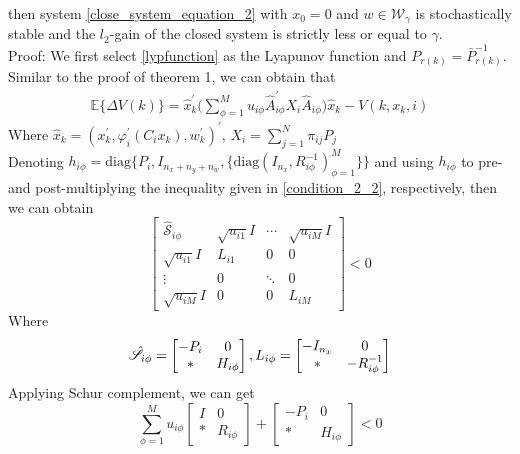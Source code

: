 \documentclass[conference]{IEEEtran}
\begin{document}
then system \eqref{close_system_equation_2}  with $x_0=0$ and $w\in\mathcal{W}_{\gamma}$ is stochastically stable and the $l_2$-gain of the closed system is strictly less or equal to $\gamma$.
\\
Proof: We first select \eqref{lypfunction} as the Lyapunov function and $P_{r(k)}=\bar{P}^{-1}_{r(k)}$. Similar to the proof of theorem 1, we can obtain that
\begin{equation}
	\begin{split}
		\mathbb{E}\{\varDelta V(k)\}=\hat{x}^{'}_{k} \Big( \sum_{\phi=1}^{M}u_{i\phi}\hat{A}^{'}_{i\phi}X_{i}\hat{A}_{i\phi}\Big) \hat{x}_{k} -V(k,x_k,i)
	\end{split}
\end{equation}
Where $\hat{x}_{k}=(x^{'}_{k},\varphi^{'}_{i}(C_{i}x_{k}),w^{'}_{k})^{'}$, $ X_{i}=\sum_{j=1}^{N}\pi_{ij}P_{j}$ \\
Denoting $h_{i\phi} = \mathrm{diag}\{P_{i}, I_{n_x+n_y+n_w},\{\mathrm{diag}(I_{n_x},R^{-1}_{i\phi})^{M}_{\phi=1} \} \}$ and using $h_{i\phi}$ to pre- and post-multiplying the inequality given in \eqref{condition_2_2}, respectively, then we can obtain \\
\begin{equation}\nonumber
\begin{bmatrix} 
\hat{\mathscr{S}}_{i\phi}&
\sqrt{u_{i1}}I&
\cdots&
\sqrt{u_{iM}}I\\
\sqrt{u_{i1}}I&L_{i1}&0&0\\ 
\vdots&0&\ddots&0\\
\sqrt{u_{iM}}I&0&0&
L_{iM}

\end{bmatrix} <0
\end{equation}
Where 
\begin{equation} \notag
\begin{aligned}
\hat{\mathscr{S}}_{i\phi}=\begin{bmatrix}
-P_{i }&0\\
*&H_{i\phi}
\end{bmatrix},
L_{i\phi} = \begin{bmatrix}
-I_{n_x}&0\\
*&-R^{-1}_{i\phi}
\end{bmatrix}
\end{aligned}
\end{equation}
Applying Schur complement, we can get \\
\begin{equation} \label{cons2}
\sum_{\phi=1}^{M}u_{i\phi} \begin{bmatrix}
I&0\\
*&R_{i\phi}
\end{bmatrix} + \begin{bmatrix}
-P_{i }&0\\
*&H_{i\phi}
\end{bmatrix} <0
\end{equation}
\end{document}

